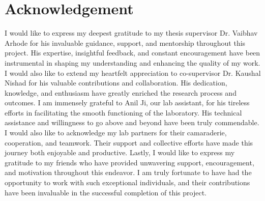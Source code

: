 \chapter*{Acknowledgement}
I would like to express my deepest gratitude to my thesis supervisor Dr. Vaibhav Arhode for his invaluable guidance, support, and mentorship throughout this project. His expertise, insightful feedback, and constant encouragement have been instrumental in shaping my understanding and enhancing the quality of my work.
I would also like to extend my heartfelt appreciation to co-supervisor Dr. Kaushal Nishad for his valuable contributions and collaboration. His dedication, knowledge, and enthusiasm have greatly enriched the research process and outcomes.
I am immensely grateful to Anil Ji, our lab assistant, for his tireless efforts in facilitating the smooth functioning of the laboratory. His technical assistance and willingness to go above and beyond have been truly commendable.
I would also like to acknowledge my lab partners for their camaraderie, cooperation, and teamwork. Their support and collective efforts have made this journey both enjoyable and productive.
Lastly, I would like to express my gratitude to my friends who have provided unwavering support, encouragement, and motivation throughout this endeavor.
I am truly fortunate to have had the opportunity to work with such exceptional individuals, and their contributions have been invaluable in the successful completion of this project.


\vspace*{1.5cm}
\begin{flushright}
\authorname
\end{flushright}


